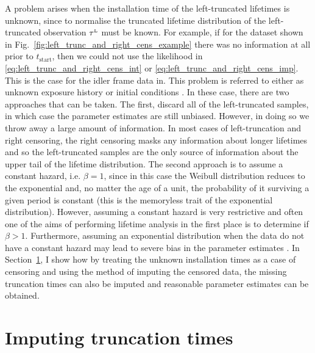 A problem arises when the installation time of the left-truncated lifetimes is unknown, since to normalise the truncated lifetime distribution of the left-truncated observation $\tau^{\hbox{\tiny{L}}}$ must be known. For example, if for the dataset shown in Fig.~\ref{fig:left_trunc_and_right_cens_example} there was no information at all prior to $t_\text{start}$, then we could not use the likelihood in \eqref{eq:left_trunc_and_right_cens_int} or \eqref{eq:left_trunc_and_right_cens_imp}. This is the case for the idler frame data in. This problem is referred to either as unknown exposure history or initial conditions \citep{guo1993}. In these case, there are two approaches that can be taken. The first, discard all of the left-truncated samples, in which case the parameter estimates are still unbiased. However, in doing so we throw away a large amount of information. In most cases of left-truncation and right censoring, the right censoring masks any information about longer lifetimes and so the left-truncated samples are the only source of information about the upper tail of the lifetime distribution. The second approach is to assume a constant hazard, i.e. $\beta = 1$, since in this case the Weibull distribution reduces to the exponential and, no matter the age of a unit, the probability of it surviving a given period is constant (this is the memoryless trait of the exponential distribution). However, assuming a constant hazard is very restrictive and often one of the aims of performing lifetime analysis in the first place is to determine if $\beta > 1$. Furthermore, assuming an exponential distribution when the data do not have a constant hazard may lead to severe bias in the parameter estimates \citep{heckman1986}. In Section~\ref{sec:lt-imputation}, I show how by treating the unknown installation times as a case of censoring and using the method of imputing the censored data, the missing truncation times can also be imputed and reasonable parameter estimates can be obtained.

\section{Imputing truncation times} \label{sec:lt-imputation}

